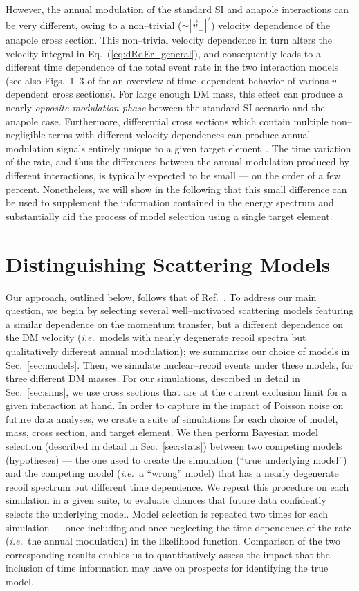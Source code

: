 \documentclass[11pt, a4paper]{article}
\newcommand{\ie}{{\it i.e.~}}  \newcommand{\eg}{{\it e.g.~}}
\newcommand{\Eq}[1]{Eq.~(\ref{#1})} \newcommand{\Eqs}[2]{Eqs.~(\ref{#1}) and (\ref{#2})} \newcommand{\Eqm}[2]{Eqs.~(\ref{#1}) through (\ref{#2})}
\newcommand{\Sec}[1]{Sec.~\ref{#1}} \newcommand{\Secs}[2]{Secs.~\ref{#1} and \ref{#2}} \newcommand{\Secm}[2]{Secs.~\ref{#1} through \ref{#2}}
\begin{document}
However, the annual modulation of the standard SI and anapole interactions can be very different, owing to a non--trivial ($\sim | \vec v_\perp|^2$) velocity dependence of the anapole cross section. This non--trivial velocity dependence in turn alters the velocity integral in \Eq{eq:dRdEr_general}, and consequently leads to a different time dependence of the total event rate in the two interaction models (see also Figs.~1--3 of \cite{DelNobile:2015rmp} for an overview of time--dependent behavior of various $v$--dependent cross sections). For large enough DM mass, this effect can produce a nearly {\it opposite modulation phase} between the standard SI scenario and the anapole case. Furthermore, differential cross sections which contain multiple non--negligible terms with different velocity dependences can produce annual modulation signals entirely unique to a given target element~\cite{DelNobile:2015tza,DelNobile:2015rmp}. The time variation of the rate, and thus the differences between the annual modulation produced by different interactions, is typically expected to be small --- on the order of a few percent. Nonetheless, we will show in the following that this small difference can be used to supplement the information contained in the energy spectrum and substantially aid the process of model selection using a single target element. 

\section{Distinguishing Scattering Models}\label{sec:procedure}

Our approach, outlined below, follows that of Ref.~\cite{Gluscevic:2015sqa}. To address our main question, we begin by selecting several well--motivated scattering models featuring a similar dependence on the momentum transfer, but a different dependence on the DM velocity (\ie models with nearly degenerate recoil spectra but qualitatively different annual modulation); we summarize our choice of models in \Sec{sec:models}. Then, we simulate nuclear--recoil events under these models, for three different DM masses. For our simulations, described in detail in \Sec{sec:sims}, we use cross sections that are at the current exclusion limit for a given interaction at hand. In order to capture in the impact of Poisson noise on future data analyses, we create a suite of simulations for each choice of model, mass, cross section, and target element. We then perform Bayesian model selection (described in detail in \Sec{sec:stats}) between two competing models (hypotheses) --- the one used to create the simulation (``true underlying model'') and the competing model (\ie a ``wrong'' model) that has a nearly degenerate recoil spectrum but different time dependence.  We repeat this procedure on each simulation in a given suite, to evaluate chances that future data confidently selects the underlying model. Model selection is repeated two times for each simulation --- once including and once neglecting the time dependence of the rate (\ie the annual modulation) in the likelihood function. Comparison of the two corresponding results enables us to quantitatively assess the impact that the inclusion of time information may have on prospects for identifying the true model. 
 
\end{document}
